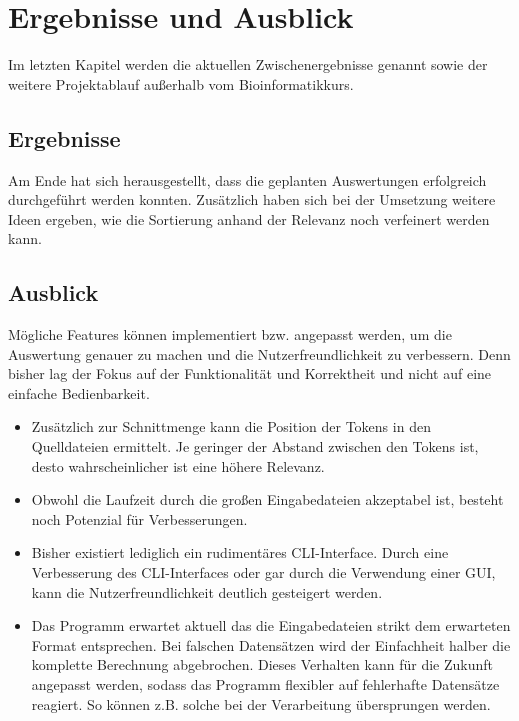 \documentclass[a4paper,10pt]{article}
\begin{document}
\section{Ergebnisse und Ausblick}
    Im letzten Kapitel werden die aktuellen Zwischenergebnisse genannt sowie der weitere Projektablauf außerhalb vom Bioinformatikkurs.

    \subsection{Ergebnisse}
        Am Ende hat sich herausgestellt, dass die geplanten Auswertungen erfolgreich durchgeführt werden konnten. Zusätzlich haben sich bei der Umsetzung weitere Ideen ergeben, wie die Sortierung anhand der Relevanz noch verfeinert werden kann.

    \subsection{Ausblick}
        Mögliche Features können implementiert bzw. angepasst werden, um die Auswertung genauer zu machen und die Nutzerfreundlichkeit zu verbessern. Denn bisher lag der Fokus auf der Funktionalität und Korrektheit und nicht auf eine einfache Bedienbarkeit.
        \begin{itemize}
            \item Zusätzlich zur Schnittmenge kann die Position der Tokens in den Quelldateien ermittelt. Je geringer der Abstand zwischen den Tokens ist, desto wahrscheinlicher ist eine höhere Relevanz.
            \item Obwohl die Laufzeit durch die großen Eingabedateien akzeptabel ist, besteht noch Potenzial für Verbesserungen.
            \item Bisher existiert lediglich ein rudimentäres CLI-Interface. Durch eine Verbesserung des CLI-Interfaces oder gar durch die Verwendung einer GUI, kann die Nutzerfreundlichkeit deutlich gesteigert werden.
            \item Das Programm erwartet aktuell das die Eingabedateien strikt dem erwarteten Format entsprechen. Bei falschen Datensätzen wird der Einfachheit halber die komplette Berechnung abgebrochen. Dieses Verhalten kann für die Zukunft angepasst werden, sodass das Programm flexibler auf fehlerhafte Datensätze reagiert. So können z.B. solche bei der Verarbeitung übersprungen werden.
        \end{itemize}
\end{document}
